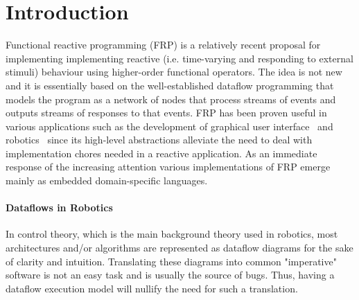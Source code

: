 \documentclass[sigplan,review,anonymous]{acmart}
\begin{document}

\maketitle

\section{Introduction} \label{sec:introduction}

Functional reactive programming (FRP) \cite{fran} is a relatively recent
proposal for implementing implementing reactive (i.e. time-varying
and responding to external stimuli) behaviour using higher-order functional operators.
The idea is not new and it is essentially based on the well-established dataflow programming
that models the program as a network of nodes that process streams of events
and outputs streams of responses to that events. FRP has been proven useful in
various applications such as the development of graphical user interface~\cite{fran} and robotics~\cite{}
since its high-level abstractions alleviate the need to deal with implementation
chores needed in a reactive application. As an immediate response of the increasing
attention various implementations of FRP emerge mainly as embedded domain-specific languages.


\paragraph{Dataflows in Robotics}

In control theory, which is the main background theory used in robotics, most
architectures and/or algorithms are represented as dataflow diagrams for the
sake of clarity and intuition. Translating these diagrams into common
"imperative" software is not an easy task and is usually the source of bugs.
Thus, having a dataflow execution model will nullify the need for such a
translation.
\end{document}
